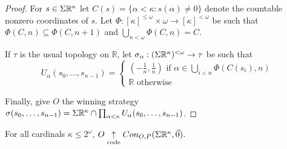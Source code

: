 \begin{proof}
For $s\in\Sigma\mathbb{R}^{\kappa}$ let $C(s)=\{\alpha<\kappa:s(\alpha)\not=0\}$ denote the countable nonzero coordinates of $s$. Let $\Phi:[\kappa]^{\leq\omega}\times\omega\to[\kappa]^{<\omega}$ be such that $\Phi(C,n)\subseteq\Phi(C,n+1)$ and $\bigcup_{n<\omega}\Phi(C,n)=C$.

If $\tau$ is the usual topology on $\mathbb{R}$, let $\sigma_\alpha:(\Sigma\mathbb{R}^{\kappa})^{<\omega}\to\tau$ be such that
\[
U_\alpha(s_0,\dots,s_{n-1})=\left\{
\begin{array}{l}
(-\frac{1}{n},\frac{1}{n}) \text{ if } \alpha\in\bigcup_{i<n}\Phi(C(s_i),n) \\
\mathbb{R} \text{ otherwise}
\end{array}
\right.
\]

Finally, give $O$ the winning strategy $\sigma(s_0,\dots,s_{n-1})=\Sigma\mathbb{R}^{\kappa}\cap\prod_{\alpha<\kappa}U_\alpha(s_0,\dots,s_{n-1})$.
\end{proof}

\begin{thm}
For all cardinals $\kappa\leq 2^\omega$, $O\underset{\text{code}}{\uparrow}Con_{O,P}(\Sigma\mathbb{R}^{\kappa},\vec{0})$.
\end{thm}

